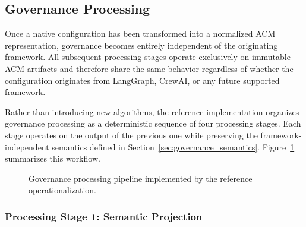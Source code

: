 \documentclass[10pt]{article}
\begin{document}
\subsection{Governance Processing}
\label{sec:governance_algorithms}

Once a native configuration has been transformed into a normalized ACM representation, governance becomes entirely independent of the originating framework. All subsequent processing stages operate exclusively on immutable ACM artifacts and therefore share the same behavior regardless of whether the configuration originates from LangGraph, CrewAI, or any future supported framework.

Rather than introducing new algorithms, the reference implementation organizes governance processing as a deterministic sequence of four processing stages. Each stage operates on the output of the previous one while preserving the framework-independent semantics defined in Section~\ref{sec:governance_semantics}. Figure~\ref{fig:governance_processing_pipeline} summarizes this workflow.

\begin{figure}[ht]
\centering
{}

\caption{Governance processing pipeline implemented by the reference operationalization.}
\label{fig:governance_processing_pipeline}
\end{figure}

\subsubsection{Processing Stage 1: Semantic Projection}
\end{document}
